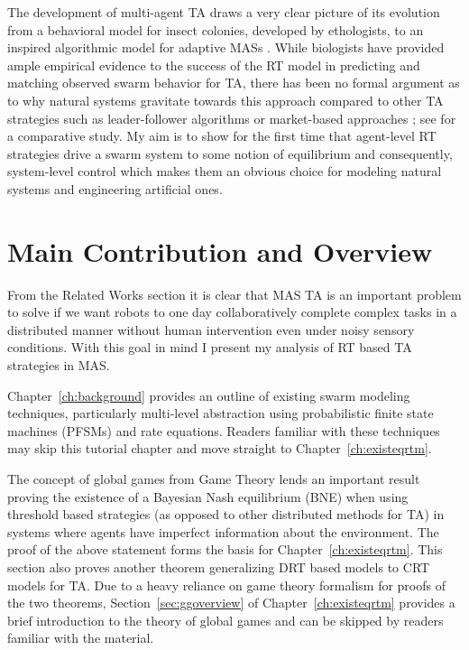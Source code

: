 \documentclass[defaultstyle,12pt]{thesis}
\begin{document}
The development of multi-agent TA draws a very clear picture of its evolution from a behavioral model for insect colonies, developed by ethologists, to an inspired algorithmic model for adaptive MASs \cite{Krieger2000}. While biologists have provided ample empirical evidence to the success of the RT model in predicting and matching observed swarm behavior for TA, there has been no formal argument as to why natural systems gravitate towards this approach compared to other TA strategies such as leader-follower algorithms \cite{Chen2011} or market-based approaches \cite{Amstutz2008,Vig2007}; see \cite{Kalra2006} for a comparative study. My aim is to show for the first time that agent-level RT strategies drive a swarm system to some notion of equilibrium and consequently, system-level control which makes them an obvious choice for modeling natural systems and engineering artificial ones.

\section{Main Contribution and Overview}
%
%
%
From the Related Works section it is clear that MAS TA is an important problem to solve if we want robots to one day collaboratively complete complex tasks in a distributed manner without human intervention even under noisy sensory conditions. With this goal in mind I present my analysis of RT based TA strategies in MAS.

Chapter~\ref{ch:background} provides an outline of existing swarm modeling techniques, particularly multi-level abstraction using probabilistic finite state machines (PFSMs) and rate equations. Readers familiar with these techniques may skip this tutorial chapter and move straight to Chapter~\ref{ch:existeqrtm}. 

The concept of global games from Game Theory lends an important result proving the existence of a Bayesian Nash equilibrium (BNE) when using threshold based strategies (as opposed to other distributed methods for TA) in systems where agents have imperfect information about the environment. The proof of the above statement forms the basis for Chapter~\ref{ch:existeqrtm}. This section also proves another theorem generalizing DRT based models to CRT models for TA. Due to a heavy reliance on game theory formalism for proofs of the two theorems, Section~\ref{sec:ggoverview} of Chapter~\ref{ch:existeqrtm} provides a brief introduction to the theory of global games and can be skipped by readers familiar with the material.
\end{document}
